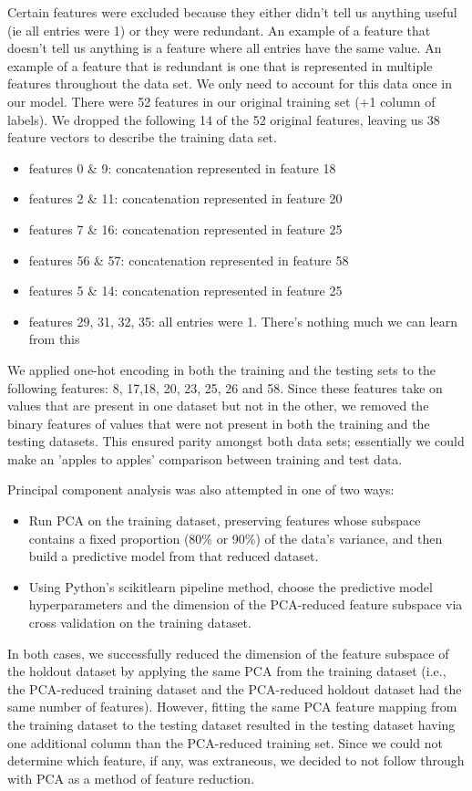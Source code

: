 \documentclass[twoside,11pt]{article}
\begin{document}
Certain features were excluded because they either didn't tell us anything useful (ie all entries were 1) or they were redundant. An example of a feature that doesn't tell us anything is a feature where all entries have the same value.  An example of a feature that is redundant is one that is represented in multiple features throughout the data set. We only need to account for this data once in our model. There were 52 features in our original training set (+1 column of labels). We dropped the following 14 of the 52 original features, leaving us 38 feature vectors to describe the training data set.
\begin{itemize}
	\item features 0 \& 9: concatenation represented in feature 18
	\item features 2 \& 11: concatenation represented in feature 20
	\item features 7 \& 16: concatenation represented in feature 25
	\item features 56 \& 57: concatenation represented in feature 58
	\item features 5 \& 14: concatenation represented in feature 25
	\item features 29, 31, 32, 35: all entries were 1. There's nothing much we can learn from this
\end{itemize}

We applied one-hot encoding in both the training and the testing sets to the following features: 8, 17,18, 20, 23, 25, 26 and 58. Since these features take on values that are present in one dataset but not in the other, we removed the binary features of values that were not present in both the training and the testing datasets.  This ensured parity amongst both data sets; essentially we could make an 'apples to apples' comparison between training and test data.

Principal component analysis was also attempted in one of two ways:
\begin{itemize}
	\item Run PCA on the training dataset, preserving features whose subspace contains a fixed proportion (80\% or 90\%) of the data's variance, and then build a predictive model from that reduced dataset.
	\item Using Python's scikitlearn pipeline method, choose the predictive model hyperparameters and the dimension of the PCA-reduced feature subspace via cross validation on the training dataset.
\end{itemize}
In both cases, we successfully reduced the dimension of the feature subspace of the holdout dataset by applying the same PCA from the training dataset (i.e., the PCA-reduced training dataset and the PCA-reduced holdout dataset had the same number of features). However, fitting the same PCA feature mapping from the training dataset to the testing dataset resulted in the testing dataset having one additional column than the PCA-reduced training set. Since we could not determine which feature, if any, was extraneous, we decided to not follow through with PCA as a method of feature reduction.
\end{document}
